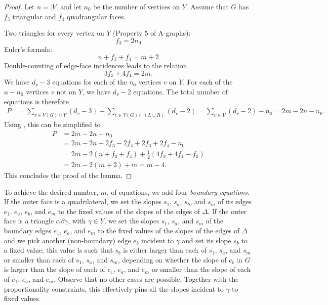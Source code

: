 \begin{proof}
Let $n=|V|$ and let $n_0$ be the number
of vertices on $Y$. Assume that $G$ has $f_3$ triangular and $f_4$
quadrangular faces.

Two triangles for every vertex on $Y$ (Property 5 of A-graphs):
\begin{equation}
\label{eq:f3}
f_3 = 2n_0
\end{equation}
Euler's formula:
\begin{equation}
\label{eq:Euler}
n + f_3+f_4 = m+2
\end{equation}
Double-counting of edge-face incidences leads to the relation
\begin{equation}
\label{eq:edge-face}
3f_3+4f_4=2m.
\end{equation}
We have $d_v-3$ equations for each of the $n_0$ vertices $v$ on $Y$. For each of the 
$n-n_0$ vertices $v$ not on $Y$, 
we have $d_v-2$ equations.
The total number of equations is therefore
\begin{align*}
P &= 
\sum_{v\in V(G)\cap Y}(d_v-3)+
\sum_{v\in V(G)\cap(L\cup R)}(d_v-2)
=
\sum_{v\in V}(d_v-2)-n_0
=
2m-2n-n_0.
\end{align*}
Using \thetag{\ref{eq:f3}--\ref{eq:edge-face}}, this can be
simplified to
\begin{align*}
P&=
2m-2n-n_0\\
&= 2m -2n -2f_3-2f_4 +2f_3+2f_4-n_0\\
&= 2m -2(n +f_3+f_4) +\tfrac12(4f_3+4f_4-f_3)\\
&= 2m -2(m+2) +m = m-4.
\end{align*}
This concludes the proof of the lemma.
\end{proof}

To achieve the desired number, $m$, of equations, we add
four \emph{boundary equations}.  If the outer face is a quadrilateral, we set
the slopes $s_1$, $s_a$, $s_b$, and $s_m$ of its edges $e_1$, $e_a$, $e_b$, and $e_m$ to the fixed values of the slopes of the edges of $\Delta$. If the outer face is a triangle $\alpha\beta\gamma$, with $\gamma\in Y$, we set the slopes $s_1$, $s_a$, and $s_m$ of the boundary edges $e_1$, $e_a$, and $e_m$ to the fixed values of the slopes of the edges of $\Delta$ and we pick another (non-boundary) edge $e_b$ incident to $\gamma$ and set its slope $s_b$ to a fixed value; this value is such that $s_b$ is either larger than each of $s_1$, $s_a$, and $s_m$ or smaller than each of $s_1$, $s_a$, and $s_m$, depending on whether the slope of $e_b$ in $G$ is larger than the slope of each of $e_1$, $e_a$, and $e_m$ or smaller than the slope of each of $e_1$, $e_a$, and $e_m$. Observe that no other cases are possible. Together with the proportionality constraints, this effectively pins all the slopes incident to $\gamma$ to fixed values.

